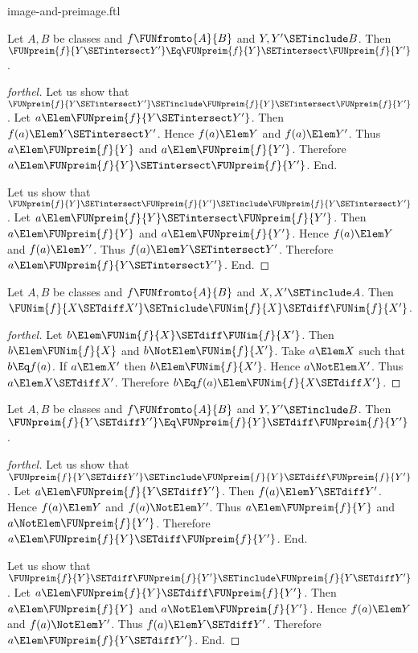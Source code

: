 \documentclass{stex}
\begin{document}
\begin{smodule}{image-and-preimage.ftl}
\begin{proposition}[forthel]
  Let $A, B$ be classes and $f \FUNfromto{A}{B}$ and $Y, Y' \SETinclude B$.
  Then $\FUNpreim{f}{Y \SETintersect Y'} \Eq \FUNpreim{f}{Y} \SETintersect \FUNpreim{f}{Y'}$.
\end{proposition}
\begin{proof}[forthel]
  Let us show that $\FUNpreim{f}{Y \SETintersect Y'} \SETinclude \FUNpreim{f}{Y} \SETintersect \FUNpreim{f}{Y'}$.
    Let $a \Elem \FUNpreim{f}{Y \SETintersect Y'}$.
    Then $f(a) \Elem Y \SETintersect Y'$.
    Hence $f(a) \Elem Y$ and $f(a) \Elem Y'$.
    Thus $a \Elem \FUNpreim{f}{Y}$ and $a \Elem \FUNpreim{f}{Y'}$.
    Therefore $a \Elem \FUNpreim{f}{Y} \SETintersect \FUNpreim{f}{Y'}$.
  End.

  Let us show that $\FUNpreim{f}{Y} \SETintersect \FUNpreim{f}{Y'} \SETinclude \FUNpreim{f}{Y \SETintersect Y'}$.
    Let $a \Elem \FUNpreim{f}{Y} \SETintersect \FUNpreim{f}{Y'}$.
    Then $a \Elem \FUNpreim{f}{Y}$ and $a \Elem \FUNpreim{f}{Y'}$.
    Hence $f(a) \Elem Y$ and $f(a) \Elem Y'$.
    Thus $f(a) \Elem Y \SETintersect Y'$.
    Therefore $a \Elem \FUNpreim{f}{Y \SETintersect Y'}$.
  End.
\end{proof}

\begin{proposition}[forthel]
  Let $A, B$ be classes and $f \FUNfromto{A}{B}$ and $X, X' \SETinclude A$.
  Then $\FUNim{f}{X \SETdiff X'} \SETniclude \FUNim{f}{X} \SETdiff \FUNim{f}{X'}$.
\end{proposition}
\begin{proof}[forthel]
  Let $b \Elem \FUNim{f}{X} \SETdiff \FUNim{f}{X'}$.
  Then $b \Elem \FUNim{f}{X}$ and $b \NotElem \FUNim{f}{X'}$.
  Take $a \Elem X$ such that $b \Eq f(a)$.
  If $a \Elem X'$ then $b \Elem \FUNim{f}{X'}$.
  Hence $a \NotElem X'$.
  Thus $a \Elem X \SETdiff X'$.
  Therefore $b \Eq f(a) \Elem \FUNim{f}{X \SETdiff X'}$.
\end{proof}

\begin{proposition}[forthel]
  Let $A, B$ be classes and $f \FUNfromto{A}{B}$ and $Y, Y' \SETinclude B$.
  Then $\FUNpreim{f}{Y \SETdiff Y'} \Eq \FUNpreim{f}{Y} \SETdiff \FUNpreim{f}{Y'}$.
\end{proposition}
\begin{proof}[forthel]
  Let us show that $\FUNpreim{f}{Y \SETdiff Y'} \SETinclude \FUNpreim{f}{Y} \SETdiff \FUNpreim{f}{Y'}$.
    Let $a \Elem \FUNpreim{f}{Y \SETdiff Y'}$.
    Then $f(a) \Elem Y \SETdiff Y'$.
    Hence $f(a) \Elem Y$ and $f(a) \NotElem Y'$.
    Thus $a \Elem \FUNpreim{f}{Y}$ and $a \NotElem \FUNpreim{f}{Y'}$.
    Therefore $a \Elem \FUNpreim{f}{Y} \SETdiff \FUNpreim{f}{Y'}$.
  End.

  Let us show that $\FUNpreim{f}{Y} \SETdiff \FUNpreim{f}{Y'} \SETinclude \FUNpreim{f}{Y \SETdiff Y'}$.
    Let $a \Elem \FUNpreim{f}{Y} \SETdiff \FUNpreim{f}{Y'}$.
    Then $a \Elem \FUNpreim{f}{Y}$ and $a \NotElem \FUNpreim{f}{Y'}$.
    Hence $f(a) \Elem Y$ and $f(a) \NotElem Y'$.
    Thus $f(a) \Elem Y \SETdiff Y'$.
    Therefore $a \Elem \FUNpreim{f}{Y \SETdiff Y'}$.
  End.
\end{proof}
\end{smodule}
\end{document}
